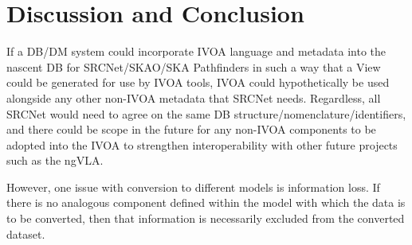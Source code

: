 \section{Discussion and Conclusion}\label{sec:discussion}

If a DB/DM system could incorporate IVOA language and metadata into the nascent DB for SRCNet/SKAO/SKA Pathfinders in such a way that a View could be generated for use by IVOA tools, IVOA could hypothetically be used alongside any other non-IVOA metadata that SRCNet needs.  Regardless, all SRCNet would need to agree on the same DB structure/nomenclature/identifiers, and there could be scope in the future for any non-IVOA components to be adopted into the IVOA to strengthen interoperability with other future projects such as the ngVLA.

However, one issue with conversion to different models is information loss. 
If there is no analogous component defined within the model with which the data is to be converted, then that information is necessarily excluded from the converted dataset. 





